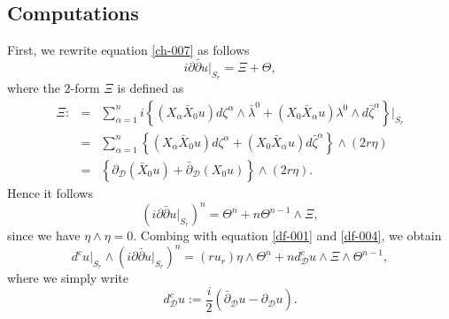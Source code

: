 \documentclass[a4paper,11pt]{amsart}
\numberwithin{equation}{section}
\def\dbar{\bar\partial}
\def\ddbar{\partial\bar\partial}
\def\d{\partial}
\def\cD{{\mathcal D}}
\def\a{{\alpha}}
\def\z{{\zeta}}
\begin{document}
\subsection{Computations}
First,  
we rewrite equation \eqref{ch-007} as follows
\begin{equation}
\label{df-002}
i\ddbar u|_{S_r} = \Xi  + \Theta, 
\end{equation}
where the $2$-form $\Xi$ is defined as 
\begin{eqnarray}
\label{df-003}
 \Xi: &=& 
 \sum_{\a =1}^n i \left\{ (X_\a \bar X_0 u)   d\z^{\a}\wedge \bar\lambda^0 + (X_0 \bar X_\a u)   \lambda^0\wedge d\bar\z^{\a} \right\}|_{S_r}  
  \nonumber\\
  &=&  \sum_{\a =1}^n \left\{ (X_\a \bar X_0 u) d\z^{\a}  + (X_0 \bar X_\a u) d\bar\z^{\a}  \right\} \wedge (2r\eta)
  \nonumber\\
  &=&  \left\{  \d_{\cD} (\bar X_0 u) +  \dbar_{\cD} (X_0 u)   \right\} \wedge (2r \eta). 
 \end{eqnarray}
Hence it follows 
\begin{equation}
\label{df-004}
( i\ddbar u|_{S_r} )^n = \Theta^n + n \Theta^{n-1}\wedge \Xi,  
\end{equation}
since we have $\eta\wedge \eta =0$. 
Combing with equation \eqref{df-001} and \eqref{df-004},  
we obtain 
\begin{equation}
\label{df-0045}
 d^cu|_{S_r} \wedge ( i\ddbar u|_{S_r} )^n 
 = (ru_r)\eta \wedge \Theta^n + n d^c_{\cD}u \wedge \Xi \wedge \Theta^{n-1},
\end{equation}
where we simply write 
$$ d^c_{\cD}u:= \frac{i }{2}(\dbar_{\cD} u - \d_{\cD} u ). $$
\end{document}
